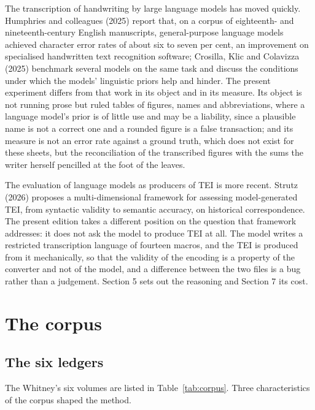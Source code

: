 \documentclass[11pt]{article}
\begin{document}
The transcription of handwriting by large language models has moved quickly. Humphries and colleagues (2025) report that, on a corpus of eighteenth- and nineteenth-century English manuscripts, general-purpose language models achieved character error rates of about six to seven per cent, an improvement on specialised handwritten text recognition software; Crosilla, Klic and Colavizza (2025) benchmark several models on the same task and discuss the conditions under which the models' linguistic priors help and hinder. The present experiment differs from that work in its object and in its measure. Its object is not running prose but ruled tables of figures, names and abbreviations, where a language model's prior is of little use and may be a liability, since a plausible name is not a correct one and a rounded figure is a false transaction; and its measure is not an error rate against a ground truth, which does not exist for these sheets, but the reconciliation of the transcribed figures with the sums the writer herself pencilled at the foot of the leaves.

The evaluation of language models as producers of TEI is more recent. Strutz (2026) proposes a multi-dimensional framework for assessing model-generated TEI, from syntactic validity to semantic accuracy, on historical correspondence. The present edition takes a different position on the question that framework addresses: it does not ask the model to produce TEI at all. The model writes a restricted transcription language of fourteen macros, and the TEI is produced from it mechanically, so that the validity of the encoding is a property of the converter and not of the model, and a difference between the two files is a bug rather than a judgement. Section 5 sets out the reasoning and Section 7 its cost.

\section{The corpus}

\subsection{The six ledgers}

The Whitney's six volumes are listed in Table~\ref{tab:corpus}. Three characteristics of the corpus shaped the method.
\end{document}
